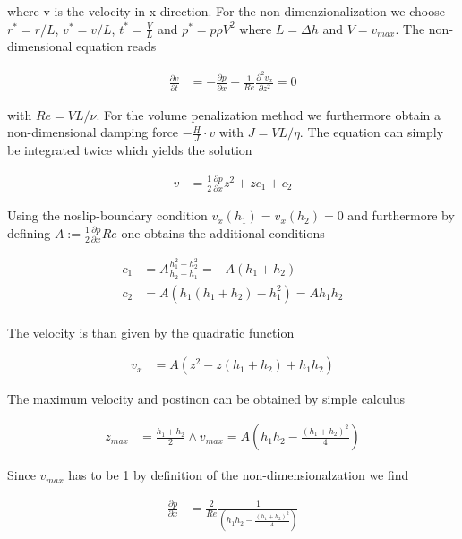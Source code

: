 where v is the velocity in x direction.
For the non-dimenzionalization we choose $r^* = r/L$, $v^*=v/L$, $t^* = \frac{V}{L}$ and $p^* = p \rho V^2$ where $L=\Delta h$ and $V=v_{max}$.
The non-dimensional equation reads

\begin{align}
\frac{\partial v}{\partial t} &= - \frac{\partial p}{\partial x} + \frac{1}{Re} \frac{\partial^2 v_x}{\partial z^2} = 0
\end{align}

with $Re = VL/\nu$.
For the volume penalization method we furthermore obtain a non-dimensional damping force $-\frac{H}{J}\cdot v$ with $J = VL/\eta$.
The equation can simply be integrated twice which yields the solution

\begin{align}
v &= \frac{1}{2}\frac{\partial p}{\partial x}z^2 + zc_1 + c_2
\end{align}

Using the noslip-boundary condition $v_x(h_1) = v_x(h_2) = 0$ and furthermore by defining
$A:=\frac{1}{2}\frac{\partial p}{\partial x} Re$ one obtains the additional conditions

\begin{align}
c_1 &= A\frac{h_1^2 -h_2^2}{h_2 - h_1} = -A(h_1+h_2)\\
c_2 &= A(h_1(h_1 + h_2) - h_1^2) = Ah_1h_2\\
\end{align}

The velocity is than given by the quadratic function

\begin{align}
v_x &= A(z^2 - z(h_1 + h_2) + h_1h_2)
\end{align}

The maximum velocity and postinon can be obtained by simple calculus

\begin{align}
z_{max} &= \frac{h_1+h_2}{2} \wedge v_{max} = A\left(h_1h_2 - \frac{(h_1 + h_2)^2}{4}\right)
\end{align}

Since $v_{max}$ has to be 1 by definition of the non-dimensionalzation we find

\begin{align}
\frac{\partial p}{\partial x} &= \frac{2}{Re}\frac{1}{\left(h_1h_2 - \frac{(h_1+h_2)^2}{4} \right)}
\end{align}

